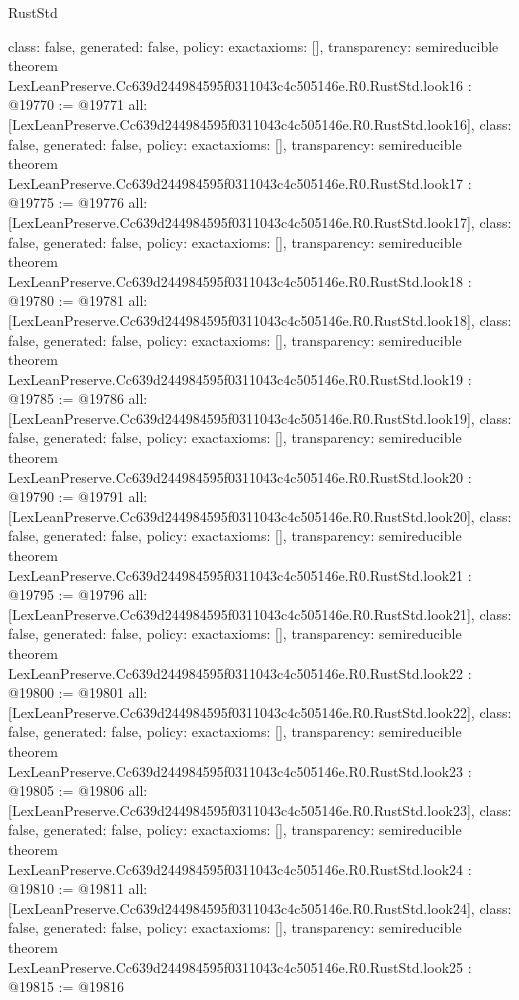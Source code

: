 \begin{lexlean}{RustStd}
\begin{coremodule}
{  class: false,
  generated: false,
  policy: exact{axioms: []},
  transparency: semireducible
}
theorem LexLeanPreserve.Cc639d244984595f0311043c4c505146e.R0.RustStd.look16 : @19770 := @19771 {
  all: [LexLeanPreserve.Cc639d244984595f0311043c4c505146e.R0.RustStd.look16],
  class: false,
  generated: false,
  policy: exact{axioms: []},
  transparency: semireducible
}
theorem LexLeanPreserve.Cc639d244984595f0311043c4c505146e.R0.RustStd.look17 : @19775 := @19776 {
  all: [LexLeanPreserve.Cc639d244984595f0311043c4c505146e.R0.RustStd.look17],
  class: false,
  generated: false,
  policy: exact{axioms: []},
  transparency: semireducible
}
theorem LexLeanPreserve.Cc639d244984595f0311043c4c505146e.R0.RustStd.look18 : @19780 := @19781 {
  all: [LexLeanPreserve.Cc639d244984595f0311043c4c505146e.R0.RustStd.look18],
  class: false,
  generated: false,
  policy: exact{axioms: []},
  transparency: semireducible
}
theorem LexLeanPreserve.Cc639d244984595f0311043c4c505146e.R0.RustStd.look19 : @19785 := @19786 {
  all: [LexLeanPreserve.Cc639d244984595f0311043c4c505146e.R0.RustStd.look19],
  class: false,
  generated: false,
  policy: exact{axioms: []},
  transparency: semireducible
}
theorem LexLeanPreserve.Cc639d244984595f0311043c4c505146e.R0.RustStd.look20 : @19790 := @19791 {
  all: [LexLeanPreserve.Cc639d244984595f0311043c4c505146e.R0.RustStd.look20],
  class: false,
  generated: false,
  policy: exact{axioms: []},
  transparency: semireducible
}
theorem LexLeanPreserve.Cc639d244984595f0311043c4c505146e.R0.RustStd.look21 : @19795 := @19796 {
  all: [LexLeanPreserve.Cc639d244984595f0311043c4c505146e.R0.RustStd.look21],
  class: false,
  generated: false,
  policy: exact{axioms: []},
  transparency: semireducible
}
theorem LexLeanPreserve.Cc639d244984595f0311043c4c505146e.R0.RustStd.look22 : @19800 := @19801 {
  all: [LexLeanPreserve.Cc639d244984595f0311043c4c505146e.R0.RustStd.look22],
  class: false,
  generated: false,
  policy: exact{axioms: []},
  transparency: semireducible
}
theorem LexLeanPreserve.Cc639d244984595f0311043c4c505146e.R0.RustStd.look23 : @19805 := @19806 {
  all: [LexLeanPreserve.Cc639d244984595f0311043c4c505146e.R0.RustStd.look23],
  class: false,
  generated: false,
  policy: exact{axioms: []},
  transparency: semireducible
}
theorem LexLeanPreserve.Cc639d244984595f0311043c4c505146e.R0.RustStd.look24 : @19810 := @19811 {
  all: [LexLeanPreserve.Cc639d244984595f0311043c4c505146e.R0.RustStd.look24],
  class: false,
  generated: false,
  policy: exact{axioms: []},
  transparency: semireducible
}
theorem LexLeanPreserve.Cc639d244984595f0311043c4c505146e.R0.RustStd.look25 : @19815 := @19816 {
}
\end{coremodule}
\end{lexlean}
